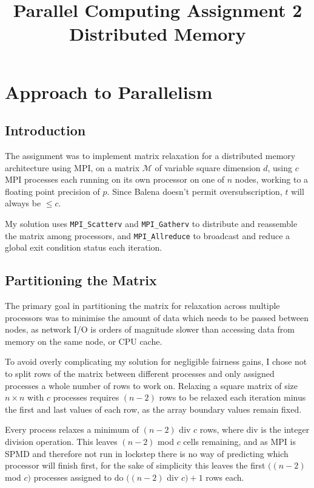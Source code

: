 \documentclass[12pt]{article}
\title{\textbf{Parallel Computing Assignment 2 \\ Distributed Memory}}
\begin{document}
\maketitle


\tableofcontents
\listoffigures
\clearpage


\section{Approach to Parallelism}

\subsection{Introduction}

The assignment was to implement matrix relaxation for a distributed memory architecture using MPI, on a matrix $\mathcal{M}$ of variable square dimension $d$, using $c$ MPI processes each running on its own processor on one of $n$ nodes, working to a floating point precision of $p$. Since Balena doesn't permit oversubscription, $t$ will always be $\leq c$.

My solution uses \texttt{MPI\_Scatterv} and \texttt{MPI\_Gatherv} to distribute and reassemble the matrix among processors, and \texttt{MPI\_Allreduce} to broadcast and reduce a global exit condition status each iteration.

\subsection{Partitioning the Matrix}

The primary goal in partitioning the matrix for relaxation across multiple processors was to minimise the amount of data which needs to be passed between nodes, as network I/O is orders of magnitude slower than accessing data from memory on the same node, or CPU cache.

To avoid overly complicating my solution for negligible fairness gains, I chose not to split rows of the matrix between different processes and only assigned processes a whole number of rows to work on. Relaxing a square matrix of size $n \times n$ with $c$ processes requires $(n-2)$ rows to be relaxed each iteration minus the first and last values of each row, as the array boundary values remain fixed.

Every process relaxes a minimum of $(n-2)$ div $c$ rows, where div is the integer division operation. This leaves $(n-2)$ mod $c$ cells remaining, and as MPI is SPMD and therefore not run in lockstep there is no way of predicting which processor will finish first, for the sake of simplicity this leaves the first $((n-2)$ mod $c)$ processes assigned to do $((n-2)$ div $c) + 1$ rows each.
\end{document}
